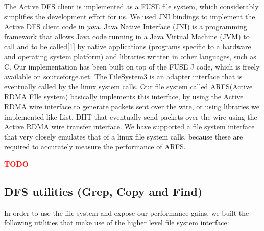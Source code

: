 \documentclass[10pt]{article}
\newcommand{\PROBLEM}[1] {\textbf{\textcolor{red}{#1}}}
\begin{document}
The Active DFS client is implemented as a FUSE file system, which considerably simplifies the development effort for us. We used JNI bindings to implement the Active DFS client code in java. Java Native Interface (JNI) is a programming framework that allows Java code running in a Java Virtual Machine (JVM) to call and to be called[1]  by native applications (programs specific to a hardware  and operating system platform) and libraries written in other languages, such as C. Our implementation has been built on top of the FUSE J code, which is freely available on sourceforge.net. The FileSystem3 is an adapter interface that is eventually called by the linux system calls. Our file system called ARFS(Active RDMA FIle system) basically implements this interface, by using the Active RDMA wire interface to generate packets sent over the wire, or using libraries we implemented like List, DHT that eventually send packets over the wire using the Active RDMA wire transfer interface. We have supported a file system interface that very closely emulates that of a linux file system calls, because these are required to accurately measure the performance of ARFS.

\PROBLEM{TODO}

\subsection{DFS utilities (Grep, Copy and Find)}

In order to use the file system and expose our performance gains, we built the following utilities that make use of the higher level file system interface:
\end{document}
